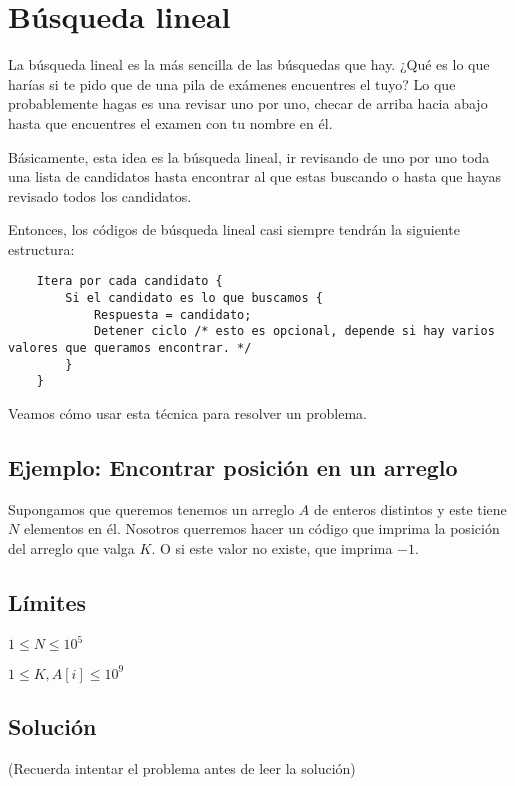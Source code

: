 \section{Búsqueda lineal}
La búsqueda lineal es la más sencilla de las búsquedas que hay. ¿Qué es lo que harías si te pido que de una pila de exámenes encuentres el tuyo? Lo que probablemente hagas es una revisar uno por uno, checar de arriba hacia abajo hasta que encuentres el examen con tu nombre en él.

Básicamente, esta idea es la búsqueda lineal, ir revisando de uno por uno toda una lista de candidatos hasta encontrar al que estas buscando o hasta que hayas revisado todos los candidatos.

Entonces, los códigos de búsqueda lineal casi siempre tendrán la siguiente estructura:

\begin{lstlisting}
	Itera por cada candidato {
		Si el candidato es lo que buscamos {
			Respuesta = candidato;
			Detener ciclo /* esto es opcional, depende si hay varios valores que queramos encontrar. */
		}
	}	
\end{lstlisting}

Veamos cómo usar esta técnica para resolver un problema.

\subsection{Ejemplo: Encontrar posición en un arreglo}

Supongamos que queremos tenemos un arreglo \(A\) de enteros distintos y este tiene \(N\) elementos en él. Nosotros querremos hacer un código que imprima la posición del arreglo que valga \(K\). O si este valor no existe, que imprima \(-1\).

\subsection*{Límites}
\begin{plimits}
	\item \(1\leq N \leq 10^5\)
	\item \(1\leq K,A[i] \leq 10^9\)
\end{plimits}
\subsection*{Solución}

(Recuerda intentar el problema antes de leer la solución)

